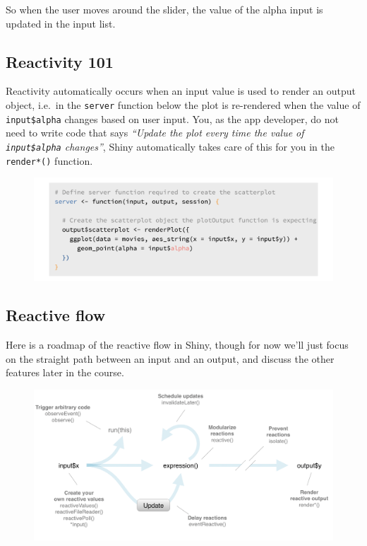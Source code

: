 \documentclass[
  letterpaper,
  DIV=11,
  numbers=noendperiod]{scrreprt}
\begin{document}
So when the user moves around the slider, the value of the alpha input
is updated in the input list.

\hypertarget{reactivity-101}{%
\subsection{Reactivity 101}\label{reactivity-101}}

Reactivity automatically occurs when an input value is used to render an
output object, i.e.~in the \texttt{server} function below the plot is
re-rendered when the value of \texttt{input\$alpha} changes based on
user input. You, as the app developer, do not need to write code that
says \emph{``Update the plot every time the value of
\texttt{input\$alpha} changes''}, Shiny automatically takes care of this
for you in the \texttt{render*()} function.

\begin{figure}

{\centering \includegraphics[width=1\textwidth,height=\textheight]{./images/server-alpha.png}

}

\end{figure}

\hypertarget{reactive-flow-2}{%
\subsection{Reactive flow}\label{reactive-flow-2}}

Here is a roadmap of the reactive flow in Shiny, though for now we'll
just focus on the straight path between an input and an output, and
discuss the other features later in the course.

\begin{figure}

{\centering \includegraphics[width=1\textwidth,height=\textheight]{./images/reactive-flow.png}

}

\end{figure}
\end{document}
